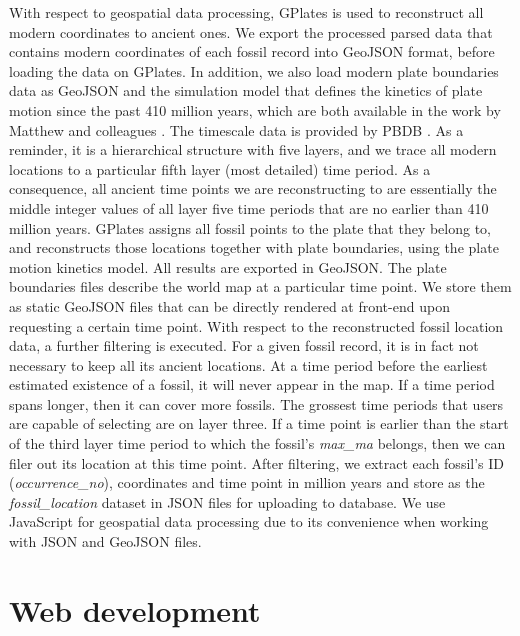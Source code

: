 \documentclass[11pt, a4paper,oneside,chapterprefix=false]{scrbook}
\begin{document}
With respect to geospatial data processing, GPlates is used to reconstruct all modern coordinates to ancient ones. We export the processed parsed data that contains modern coordinates of each fossil record into GeoJSON format, before loading the data on GPlates. In addition, we also load modern plate boundaries data as GeoJSON and the simulation model that defines the kinetics of plate motion since the past 410 million years, which are both available in the work by Matthew and colleagues \cite{matthews2016global}. The timescale data is provided by PBDB \cite{peters2016paleobiology}. As a reminder, it is a hierarchical structure with five layers, and we trace all modern locations to a particular fifth layer (most detailed) time period. As a consequence, all ancient time points we are reconstructing to are essentially the middle integer values of all layer five time periods that are no earlier than 410 million years. GPlates assigns all fossil points to the plate that they belong to, and reconstructs those locations together with plate boundaries, using the plate motion kinetics model. All results are exported in GeoJSON. The plate boundaries files describe the world map at a particular time point. We store them as static GeoJSON files that can be directly rendered at front-end upon requesting a certain time point. With respect to the reconstructed fossil location data, a further filtering is executed. For a given fossil record, it is in fact not necessary to keep all its ancient locations. At a time period before the earliest estimated existence of a fossil, it will never appear in the map. If a time period spans longer, then it can cover more fossils. The grossest time periods that users are capable of selecting are on layer three. If a time point is earlier than the start of the third layer time period to which the fossil's \emph{max\_ma} belongs, then we can filer out its location at this time point. After filtering, we extract each fossil's ID (\emph{occurrence\_no}), coordinates and time point in million years and store as the \emph{fossil\_location} dataset in JSON files for uploading to database. We use JavaScript for geospatial data processing due to its convenience when working with JSON and GeoJSON files.   

\section{Web development}\label{sec:implementation_web_development}
\end{document}
